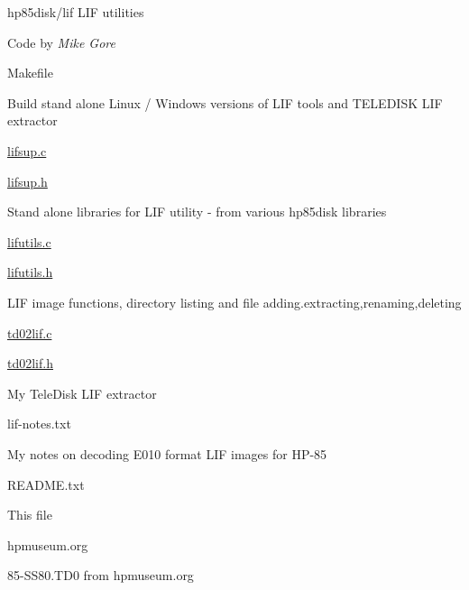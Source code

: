 \begin{DoxyItemize}
\item hp85disk/lif L\+IF utilities
\item Code by {\itshape Mike Gore}
\begin{DoxyItemize}
\item Makefile
\begin{DoxyItemize}
\item Build stand alone Linux / Windows versions of L\+IF tools and T\+E\+L\+E\+D\+I\+SK L\+IF extractor
\end{DoxyItemize}
\item \hyperlink{lifsup_8c}{lifsup.\+c}
\item \hyperlink{lifsup_8h}{lifsup.\+h}
\begin{DoxyItemize}
\item Stand alone libraries for L\+IF utility -\/ from various hp85disk libraries
\end{DoxyItemize}
\item \hyperlink{lifutils_8c}{lifutils.\+c}
\item \hyperlink{lifutils_8h}{lifutils.\+h}
\begin{DoxyItemize}
\item L\+IF image functions, directory listing and file adding.\+extracting,renaming,deleting
\end{DoxyItemize}
\item \hyperlink{td02lif_8c}{td02lif.\+c}
\item \hyperlink{td02lif_8h}{td02lif.\+h}
\begin{DoxyItemize}
\item My Tele\+Disk L\+IF extractor
\end{DoxyItemize}
\item lif-\/notes.\+txt
\begin{DoxyItemize}
\item My notes on decoding E010 format L\+IF images for H\+P-\/85
\end{DoxyItemize}
\item R\+E\+A\+D\+M\+E.\+txt
\begin{DoxyItemize}
\item This file
\end{DoxyItemize}
\end{DoxyItemize}
\item hpmuseum.\+org
\begin{DoxyItemize}
\item 85-\/\+S\+S80.\+T\+D0 from hpmuseum.\+org
\begin{DoxyItemize}

\end{DoxyItemize}
\end{DoxyItemize}
\end{DoxyItemize}
